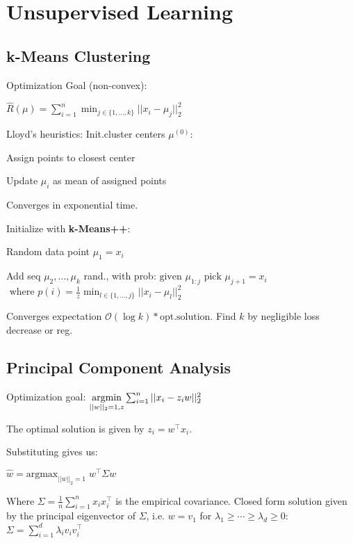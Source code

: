 \section*{Unsupervised Learning}

\subsection*{k-Means Clustering}

Optimization Goal (non-convex):

\qquad $\hat{R} (\mu) = \sum_{i=1}^n \min_{j\in \{1,\ldots,k\}} ||x_i - \mu_j||_2^2$

Lloyd's heuristics:
Init.cluster centers $\mu^{(0)}$:
\begin{compactitem}
	\item Assign points to closest center				
	\item Update $\mu_i$ as mean of assigned points
\end{compactitem}

Converges in exponential time.

Initialize with \textbf{k-Means++}:

\begin{compactitem}
	\item Random data point $\mu_1 = x_i$
	\item Add seq $\mu_2, \ldots ,\mu_k$ rand., with prob:
		$\text{given } \mu_{1:j} \text{ pick } \mu_{j+1} = x_i$ 
		$\text{ where } p(i) = \frac{1}{z} \min_{l \in \{1,\ldots,j\}} ||x_i - \mu_l||_2^2$
\end{compactitem}
Converges expectation $\mathcal O (\log k) * \text{opt.solution}$.
Find $k$ by negligible loss decrease or reg.

\subsection*{Principal Component Analysis}

Optimization goal:
$\underset{||w||_2 = 1, z}{\text{argmin}} \sum_{i=1}^n ||x_i - z_i w||_2^2$

The optimal solution is given by $z_i = w^\top x_i$.  

Substituting gives us:

\qquad \qquad $\hat{w} = \text{argmax}_{||w||_2=1} \; w^\top \Sigma w$

Where $\Sigma = \frac{1}{n} \sum_{i=1}^n x_i x_i^\top$ is the empirical covariance. Closed form solution given by the principal eigenvector of $\Sigma$, i.e. $w = v_1$ for $\lambda_1 \geq \cdots \geq \lambda_d \geq 0$:
$\Sigma = \sum_{i=1}^d \lambda_i v_i v_i^\top$

